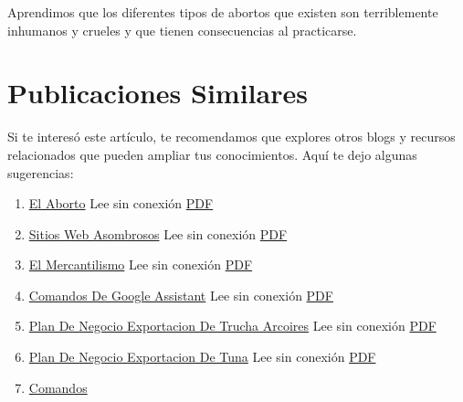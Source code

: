 \documentclass[
  jou,
  floatsintext,
  longtable,
  a4paper,
  nolmodern,
  notxfonts,
  notimes,
  colorlinks=true,linkcolor=blue,citecolor=blue,urlcolor=blue]{apa7}
\providecommand{\tightlist}{%
  \setlength{\itemsep}{0pt}\setlength{\parskip}{0pt}}
\begin{document}
Aprendimos que los diferentes tipos de abortos que existen son
terriblemente inhumanos y crueles y que tienen consecuencias al
practicarse.

\section{Publicaciones Similares}\label{publicaciones-similares}

Si te interesó este artículo, te recomendamos que explores otros blogs y
recursos relacionados que pueden ampliar tus conocimientos. Aquí te dejo
algunas sugerencias:

\begin{enumerate}
\def\labelenumi{\arabic{enumi}.}
\tightlist
\item
  \href{https://achalmaedison.netlify.app/blog/posts/2015-05-14-el-aborto}{El
  Aborto} Lee sin conexión
  \href{https://achalmaedison.netlify.app/blog/posts/2015-05-14-el-aborto/index.pdf}{PDF}
\item
  \href{https://achalmaedison.netlify.app/blog/posts/2017-04-23-sitios-web-asombrosos}{Sitios
  Web Asombrosos} Lee sin conexión
  \href{https://achalmaedison.netlify.app/blog/posts/2017-04-23-sitios-web-asombrosos/index.pdf}{PDF}
\item
  \href{https://achalmaedison.netlify.app/blog/posts/2017-05-23-el-mercantilismo}{El
  Mercantilismo} Lee sin conexión
  \href{https://achalmaedison.netlify.app/blog/posts/2017-05-23-el-mercantilismo/index.pdf}{PDF}
\item
  \href{https://achalmaedison.netlify.app/blog/posts/2020-05-23-comandos-de-google-assistant}{Comandos
  De Google Assistant} Lee sin conexión
  \href{https://achalmaedison.netlify.app/blog/posts/2020-05-23-comandos-de-google-assistant/index.pdf}{PDF}
\item
  \href{https://achalmaedison.netlify.app/blog/posts/2020-09-15-plan-de-negocio-exportacion-de-trucha-arcoires}{Plan
  De Negocio Exportacion De Trucha Arcoires} Lee sin conexión
  \href{https://achalmaedison.netlify.app/blog/posts/2020-09-15-plan-de-negocio-exportacion-de-trucha-arcoires/index.pdf}{PDF}
\item
  \href{https://achalmaedison.netlify.app/blog/posts/2021-07-13-plan-de-negocio-exportacion-de-tuna}{Plan
  De Negocio Exportacion De Tuna} Lee sin conexión
  \href{https://achalmaedison.netlify.app/blog/posts/2021-07-13-plan-de-negocio-exportacion-de-tuna/index.pdf}{PDF}
\item
  \href{https://achalmaedison.netlify.app/blog/posts/2021-07-14-comandos-de-blogdown}{Comandos
}
\end{enumerate}
\end{document}
